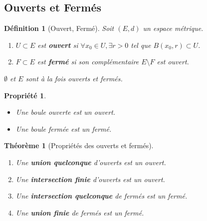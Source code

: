 \documentclass[a4paper]{article}
\newtheorem{theorem}{Théorème}[section]
\newtheorem{definition}{Définition}[section]
\newtheorem{propriete}{Propriété}[section] %
\begin{document}
\subsection{Ouverts et Fermés}
\begin{definition}[Ouvert, Fermé]
    Soit \((E, d)\) un espace métrique.
     \begin{enumerate}
        \item \(U \subset E\) est \textbf{ouvert} si \(\forall x_0 \in U, \exists r > 0\) tel que \(B(x_0, r) \subset U\).
        \item \(F \subset E\) est \textbf{fermé} si son complémentaire \(E \setminus F\) est ouvert.
    \end{enumerate}
    \(\emptyset\) et \(E\) sont à la fois ouverts et fermés.
\end{definition}
\begin{propriete}
    \begin{itemize}
        \item Une boule ouverte est un ouvert.
        \item Une boule fermée est un fermé.
    \end{itemize}
\end{propriete}
\begin{theorem}[Propriétés des ouverts et fermés]
    \begin{enumerate}
        \item Une \textbf{union quelconque} d'ouverts est un ouvert.
        \item Une \textbf{intersection finie} d'ouverts est un ouvert.
        \item Une \textbf{intersection quelconque} de fermés est un fermé.
        \item Une \textbf{union finie} de fermés est un fermé.
    \end{enumerate}
\end{theorem}
\end{document}
